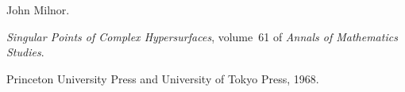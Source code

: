 John Milnor.

\newblock \emph{Singular Points of Complex Hypersurfaces}, volume~61 of
  \emph{Annals of Mathematics Studies}.

\newblock Princeton University Press and University of Tokyo Press, 1968.

